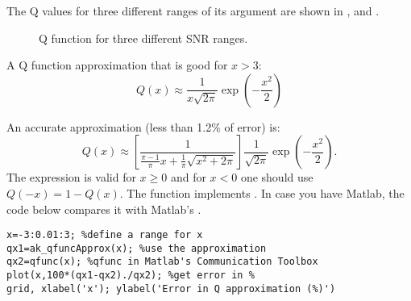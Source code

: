 The Q values for three different ranges of its argument are shown in ,  and . 

%

\begin{figure}
\centering
  \caption{Q function for three different SNR ranges.}
  \label{fig:qfuncs}
\end{figure}

A Q function approximation that is good for $x > 3$:
\begin{equation}
Q(x) \approx \frac{1}{x \sqrt{2 \pi}} \exp \left( {- \frac{x^2}{2}} \right)
\label{eq:qfunctionApproximation}
\end{equation}

An accurate approximation (less than 1.2\% of error) is:
\begin{equation}
Q(x) \approx \left[ \frac{1}{ \frac{\pi-1}{\pi}x + \frac{1}{\pi} \sqrt{x^2 + 2\pi}} \right]  \frac{1}{\sqrt{2 \pi}} \exp \left( {- \frac{x^2}{2}} \right).
\label{eq:qfunctionApproximation2}
\end{equation}
The expression is valid for $x \ge 0$ and for $x<0$ one should use $Q(-x) = 1 - Q(x)$.
The function  implements . In case you have Matlab, the code below compares it with Matlab's .
\begin{lstlisting}
x=-3:0.01:3; %define a range for x
qx1=ak_qfuncApprox(x); %use the approximation
qx2=qfunc(x); %qfunc in Matlab's Communication Toolbox
plot(x,100*(qx1-qx2)./qx2); %get error in %
grid, xlabel('x'); ylabel('Error in Q approximation (%)')
\end{lstlisting}

